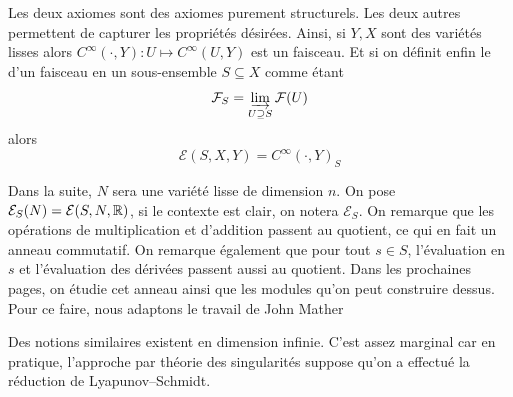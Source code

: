 \documentclass[memoire.tex]{subfiles}
\begin{document}
\begin{remarque}
\begin{itemize}
    \end{itemize}
    Les deux axiomes sont des axiomes purement structurels. Les deux autres permettent de capturer les propriétés désirées. Ainsi, si $Y,X$ sont des variétés lisses alors $C^{\infty}(\cdot,Y): U\mapsto C^{\infty}(U,Y)$ est un faisceau. Et si on définit enfin le  d'un faisceau en un sous-ensemble $S\subseteq X$ comme étant
    \begin{equation*}
        \mathcal{F}_S=\varinjlim_{U \supseteq S} \mathcal{F}(U)
    \end{equation*}
    alors
    \begin{equation*}
        \mathcal{E}(S,X,Y)=C^{\infty}(\cdot,Y)_{S}
    \end{equation*} 
\end{remarque}
Dans la suite, $N$ sera une variété lisse de dimension $n$. On pose $\mathcal{E}_S(N)
=\mathcal{E}(S,N,\mathbb{R})$, si le contexte est clair, on notera $\mathcal{E}_S$. On 
remarque que les opérations de multiplication et d'addition 
passent au quotient, ce qui en fait un 
anneau commutatif. On remarque également que pour tout $s\in S$, l'évaluation en $s$  et l'évaluation des dérivées passent aussi au quotient. Dans les prochaines pages, on étudie cet anneau ainsi que les modules qu'on peut construire dessus. Pour ce faire, nous adaptons le travail de John Mather \cite{Mather1968vol3}
\begin{remarque}
    Des notions similaires existent en dimension infinie. 
    C'est assez marginal car en pratique, l'approche par 
    théorie des singularités suppose qu'on a effectué la 
    réduction de  Lyapunov–Schmidt.
\end{remarque}
\end{document}
